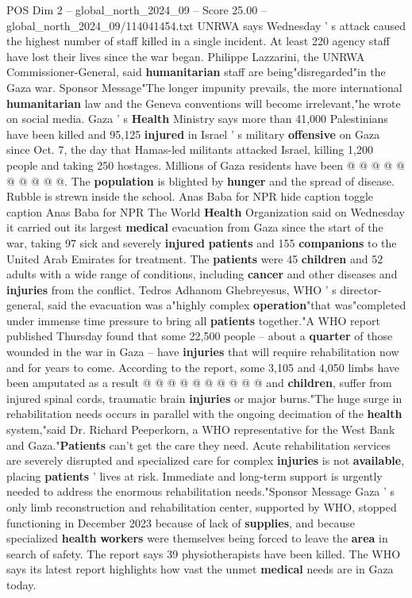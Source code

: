 \begin{textsample}{POS Dim 2 – global\_north\_2024\_09 – Score 25.00 – global\_north\_2024\_09/114041454.txt}
UNRWA says Wednesday ' s attack caused the highest number of staff killed in a single incident.
At least 220 agency staff have lost their lives since the war began.
Philippe Lazzarini, the UNRWA Commissioner-General, said \textbf{humanitarian} staff are being"disregarded"in the Gaza war.
Sponsor Message"The longer impunity prevails, the more international \textbf{humanitarian} law and the Geneva conventions will become irrelevant,"he wrote on social media.
Gaza ' s \textbf{Health} Ministry says more than 41,000 Palestinians have been killed and 95,125 \textbf{injured} in Israel ' s military \textbf{offensive} on Gaza since Oct. 7, the day that Hamas-led militants attacked Israel, killing 1,200 people and taking 250 hostages.
Millions of Gaza residents have been @ @ @ @ @ @ @ @ @ @.
The \textbf{population} is blighted by \textbf{hunger} and the spread of disease.
Rubble is strewn inside the school.
Anas Baba for NPR hide caption toggle caption Anas Baba for NPR The World \textbf{Health} Organization said on Wednesday it carried out its largest \textbf{medical} evacuation from Gaza since the start of the war, taking 97 sick and severely \textbf{injured} \textbf{patients} and 155 \textbf{companions} to the United Arab Emirates for treatment.
The \textbf{patients} were 45 \textbf{children} and 52 adults with a wide range of conditions, including \textbf{cancer} and other diseases and \textbf{injuries} from the conflict.
Tedros Adhanom Ghebreyesus, WHO ' s director-general, said the evacuation was a"highly complex \textbf{operation}"that was"completed under immense time pressure to bring all \textbf{patients} together."A WHO report published Thursday found that some 22,500 people -- about a \textbf{quarter} of those wounded in the war in Gaza -- have \textbf{injuries} that will require rehabilitation now and for years to come.
According to the report, some 3,105 and 4,050 limbs have been amputated as a result @ @ @ @ @ @ @ @ @ @ and \textbf{children}, suffer from injured spinal cords, traumatic brain \textbf{injuries} or major burns."The huge surge in rehabilitation needs occurs in parallel with the ongoing decimation of the \textbf{health} system,"said Dr.
Richard Peeperkorn, a WHO representative for the West Bank and Gaza."\textbf{Patients} can't get the care they need.
Acute rehabilitation services are severely disrupted and specialized care for complex \textbf{injuries} is not \textbf{available}, placing \textbf{patients} ' lives at risk.
Immediate and long-term support is urgently needed to address the enormous rehabilitation needs."Sponsor Message Gaza ' s only limb reconstruction and rehabilitation center, supported by WHO, stopped functioning in December 2023 because of lack of \textbf{supplies}, and because specialized \textbf{health} \textbf{workers} were themselves being forced to leave the \textbf{area} in search of safety.
The report says 39 physiotherapists have been killed.
The WHO says its latest report highlights how vast the unmet \textbf{medical} needs are in Gaza today.


\end{textsample}
